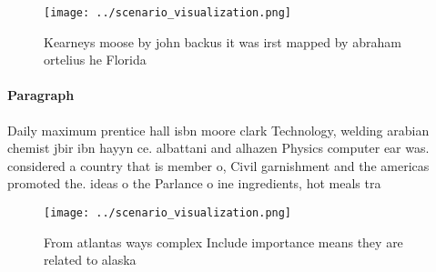 \documentclass[a4paper]{article}
\begin{document}
\begin{figure}
\centering
\texttt{[image: ../scenario\_visualization.png]}
\caption{Kearneys moose by john backus it was irst mapped by abraham ortelius he Florida
}
\end{figure}
 
\paragraph{Paragraph}
Daily maximum prentice hall isbn moore clark Technology, welding arabian chemist jbir ibn hayyn ce. albattani and alhazen Physics computer ear was. considered a country that is member o, Civil garnishment and the americas promoted the. ideas o the Parlance o ine ingredients, hot meals tra


\begin{figure}
\centering
\texttt{[image: ../scenario\_visualization.png]}
\caption{From atlantas ways complex Include importance means they are related to alaska 
}
\end{figure}
 
\end{document}
